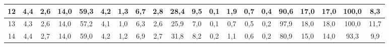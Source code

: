 \begin{sidewaystable}[]
\begin{tabular}{|c|c|c|c|c|c|c|c|c|c|c|c|c|c|c|c|c|c|c|c|}
    12 & 4,4                                              & 2,6                                              & 14,0                                             & 59,3                                             & 4,2                                              & 1,3                                              & 6,7                                              & 2,8                                              & 28,4                                             & 9,5                                              & 0,1                                              & 1,9                                              & 0,7                                              & 0,4                                              & 90,6                                            & 17,0                                            & 17,0                                            & 100,0                                           & 8,3                                             \\ \hline
    13 & 4,3                                              & 2,6                                              & 14,0                                             & 57,2                                             & 4,1                                              & 1,0                                              & 6,3                                              & 2,6                                              & 25,9                                             & 7,0                                              & 0,1                                              & 0,7                                              & 0,5                                              & 0,2                                              & 97,9                                            & 18,0                                            & 18,0                                            & 100,0                                           & 11,7                                            \\ \hline
    14 & 4,4                                              & 2,7                                              & 14,0                                             & 59,0                                             & 4,2                                              & 1,2                                              & 6,9                                              & 2,7                                              & 31,8                                             & 8,2                                              & 0,2                                              & 1,1                                              & 0,6                                              & 0,2                                              & 80,9                                            & 15,0                                            & 14,0                                            & 93,3                                            & 9,9                                             \\ \hline

\end{tabular}
\end{sidewaystable}
